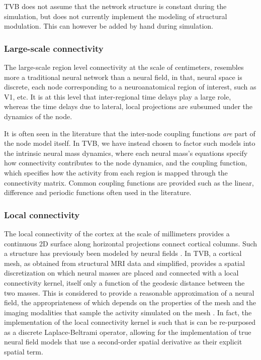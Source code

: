 \documentclass{bioinfo}
\begin{document}
TVB does not assume that the network structure is constant during the
simulation, but does not currently implement the modeling of structural
modulation. This can however be added by hand during simulation.

\subsubsection{Large-scale connectivity}

The large-scale region level connectivity at the scale of centimeters,
resembles more a traditional neural network than a neural field, in that,
neural space is discrete,  each node corresponding to a neuroanatomical
region of interest, such as V1, etc. It is at this level that inter-regional 
time delays play a large role, whereas the time delays due to 
lateral, local projections are subsumed under the dynamics of the node.

It is often seen in the literature that the inter-node coupling functions
\textit{are} part of the node model itself. In TVB, we have instead 
chosen to factor such models into the intrinsic neural mass dynamics, where each 
neural mass's equations specify how connectivity contributes to the
node dynamics, and the coupling function, which specifies how the activity
from each region is mapped through the connectivity matrix. Common coupling 
functions are provided such as the linear, difference and periodic functions
often used in the literature.

\subsubsection{Local connectivity}

The local connectivity of the cortex at the scale of millimeters provides
a continuous 2D surface along horizontal projections connect 
cortical columns. Such a structure has previously been modeled by
neural fields \citep{Amari_1977, Jirsa_1997, Liley_1999}. In TVB, a cortical mesh, 
as obtained from structural MRI data and simplified, provides a spatial 
discretization on which neural masses are placed and connected with a
local connectivity kernel, itself only a function of the geodesic distance
between the two masses. This is considered to provide a reasonable
approximation of a neural field, the appropriateness of which depends on the properties
of the mesh and the imaging modalities that sample the activity simulated
on the mesh \citep{Spiegler_2013}. In fact,
the implementation of the local connectivity kernel is such
that is can be re-purposed as a discrete Laplace-Beltrami operator,
allowing for the implementation of true neural field models that 
use a second-order spatial derivative as their explicit spatial term.
\end{document}
